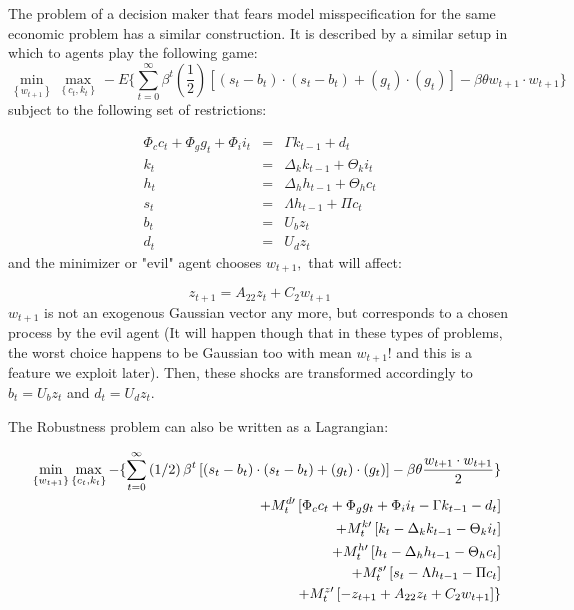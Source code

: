 \documentclass[letter, fleqn, 11pt]{article}
\begin{document}
The problem of a decision maker that fears model misspecification for the same economic problem has a similar
construction. It is described by a similar setup in which to agents play the
following game:%
\begin{equation*}
\min_{\left\{ w_{t+1}\right\} }\max_{\left\{ c_{t},k_{t}\right\}
}-E\{\sum_{t=0}^{\infty }\beta ^{t}\left( \frac{1}{2}\right) \left[
(s_{t}-b_{t})\cdot (s_{t}-b_{t})+(g_{t})\cdot (g_{t})\right] -\beta \theta
w_{t+1}\cdot w_{t+1}\}
\end{equation*}%
subject to the following set of restrictions:

\begin{eqnarray*}
\Phi _{c}c_{t}+\Phi _{g}g_{t}+\Phi _{i}i_{t} &=&\Gamma k_{t-1}+d_{t} \\
k_{t} &=&\Delta _{k}k_{t-1}+\Theta _{k}i_{t} \\
h_{t} &=&\Delta _{h}h_{t-1}+\Theta _{h}c_{t} \\
s_{t} &=&\Lambda h_{t-1}+\Pi c_{t} \\
b_{t} &=&U_{b}z_{t} \\
d_{t} &=&U_{d}z_{t}
\end{eqnarray*}%
and the minimizer or "evil" agent chooses $w_{t+1},$ that will affect:

\begin{equation*}
z_{t+1}=A_{22}z_{t}+C_{2}w_{t+1}
\end{equation*}%
$w_{t+1}$ is not an exogenous Gaussian vector any more, but corresponds to a chosen process by the evil agent (It will happen though that in these types of
problems, the worst choice happens to be Gaussian too with mean $w_{t+1}$! and this is a feature we exploit later).
Then, these shocks are transformed accordingly to $%
b_{t}=U_{b}z_{t}$ and $d_{t}=U_{d}z_{t}.$

The Robustness problem can also be written as a Lagrangian:

\begin{eqnarray*}
&&\min_{\left\{ w_{t+1}\right\} }\max_{\left\{ c_{t},k_{t}\right\}
}-\{\sum_{t=0}^{\infty }\left( 1/2\right) \beta ^{t}\left[
(s_{t}-b_{t})\cdot (s_{t}-b_{t})+(g_{t})\cdot (g_{t})\right] -\beta \theta
\frac{w_{t+1}\cdot w_{t+1}}{2}\} \\
&&+{\scriptsize M}_{t}^{d\prime }\left[ \Phi _{c}c_{t}+\Phi _{g}g_{t}+\Phi
_{i}i_{t}-\Gamma k_{t-1}-d_{t}\right]  \\
&&+{\scriptsize M}_{t}^{k\prime }\left[ k_{t}-\Delta _{k}k_{t-1}-\Theta
_{k}i_{t}\right]  \\
&&+{\scriptsize M}_{t}^{h\prime }\left[ h_{t}-\Delta _{h}h_{t-1}-\Theta
_{h}c_{t}\right]  \\
&&+{\scriptsize M}_{t}^{s\prime }\left[ s_{t}-\Lambda h_{t-1}-\Pi c_{t}%
\right]  \\
&&+{\scriptsize M}_{t}^{z\prime }\left[ -z_{t+1}+A_{22}z_{t}+C_{2}w_{t+1}%
\right] \}
\end{eqnarray*}
\end{document}
